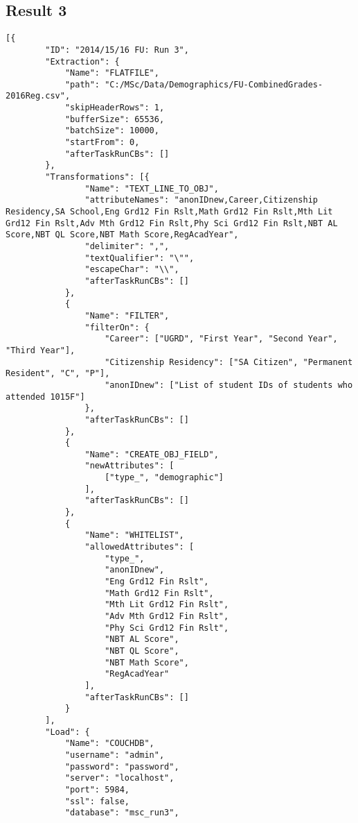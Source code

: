 \subsection{Result 3}
\label{netl-run3-config}
\begin{verbatim}
[{
        "ID": "2014/15/16 FU: Run 3",
        "Extraction": {
            "Name": "FLATFILE",
            "path": "C:/MSc/Data/Demographics/FU-CombinedGrades-2016Reg.csv",
            "skipHeaderRows": 1,
            "bufferSize": 65536,
            "batchSize": 10000,
            "startFrom": 0,
            "afterTaskRunCBs": []
        },
        "Transformations": [{
                "Name": "TEXT_LINE_TO_OBJ",
                "attributeNames": "anonIDnew,Career,Citizenship Residency,SA School,Eng Grd12 Fin Rslt,Math Grd12 Fin Rslt,Mth Lit Grd12 Fin Rslt,Adv Mth Grd12 Fin Rslt,Phy Sci Grd12 Fin Rslt,NBT AL Score,NBT QL Score,NBT Math Score,RegAcadYear",
                "delimiter": ",",
                "textQualifier": "\"",
                "escapeChar": "\\",
                "afterTaskRunCBs": []
            },
            {
                "Name": "FILTER",
                "filterOn": {
                    "Career": ["UGRD", "First Year", "Second Year", "Third Year"],
                    "Citizenship Residency": ["SA Citizen", "Permanent Resident", "C", "P"],
                    "anonIDnew": ["List of student IDs of students who attended 1015F"]
                },
                "afterTaskRunCBs": []
            },
            {
                "Name": "CREATE_OBJ_FIELD",
                "newAttributes": [
                    ["type_", "demographic"]
                ],
                "afterTaskRunCBs": []
            },
            {
                "Name": "WHITELIST",
                "allowedAttributes": [
                    "type_",
                    "anonIDnew",
                    "Eng Grd12 Fin Rslt",
                    "Math Grd12 Fin Rslt",
                    "Mth Lit Grd12 Fin Rslt",
                    "Adv Mth Grd12 Fin Rslt",
                    "Phy Sci Grd12 Fin Rslt",
                    "NBT AL Score",
                    "NBT QL Score",
                    "NBT Math Score",
                    "RegAcadYear"
                ],
                "afterTaskRunCBs": []
            }
        ],
        "Load": {
            "Name": "COUCHDB",
            "username": "admin",
            "password": "password",
            "server": "localhost",
            "port": 5984,
            "ssl": false,
            "database": "msc_run3",

\end{verbatim}
